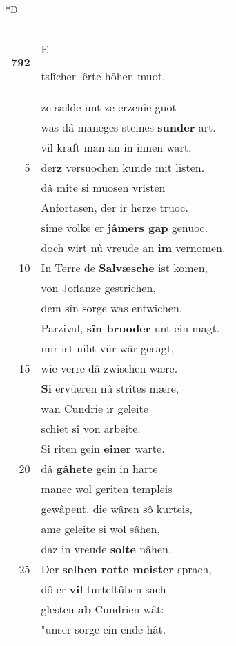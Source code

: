 \documentclass[8pt,a4paper,notitlepage]{article}
\begin{document}
\begin{table}[ht]
\begin{minipage}[t]{0.5\linewidth}
\small
\begin{center}*D
\end{center}
\begin{tabular}{rl}
\textbf{792} & \begin{large}E\end{large}tslîcher lêrte hôhen muot.\\ 
 & ze sælde unt ze erzenîe guot\\ 
 & was dâ maneges steines \textbf{sunder} art.\\ 
 & vil kraft man an in innen wart,\\ 
5 & der\textbf{z} versuochen kunde mit listen.\\ 
 & dâ mite si muosen vristen\\ 
 & Anfortasen, der ir herze truoc.\\ 
 & sîme volke er \textbf{jâmers gap} genuoc.\\ 
 & doch wirt nû vreude an \textbf{im} vernomen.\\ 
10 & In Terre de \textbf{Salvæsche} ist komen,\\ 
 & von Joflanze gestrichen,\\ 
 & dem sîn sorge was entwichen,\\ 
 & Parzival, \textbf{sîn bruoder} unt ein magt.\\ 
 & mir ist niht vür wâr gesagt,\\ 
15 & wie verre dâ zwischen wære.\\ 
 & \textbf{Si} ervüeren nû strîtes mære,\\ 
 & wan Cundrie ir geleite\\ 
 & schiet si von arbeite.\\ 
 & Si riten gein \textbf{einer} warte.\\ 
20 & dâ \textbf{gâhete} gein in harte\\ 
 & manec wol geriten templeis\\ 
 & gewâpent. die wâren sô kurteis,\\ 
 & ame geleite si wol sâhen,\\ 
 & daz in vreude \textbf{solte} nâhen.\\ 
25 & Der \textbf{selben rotte meister} sprach,\\ 
 & dô er \textbf{vil} turteltûben sach\\ 
 & glesten \textbf{ab} Cundrien wât:\\ 
 & "unser sorge ein ende hât.\\ 

\end{tabular}
\end{minipage}
\end{table}
\end{document}
